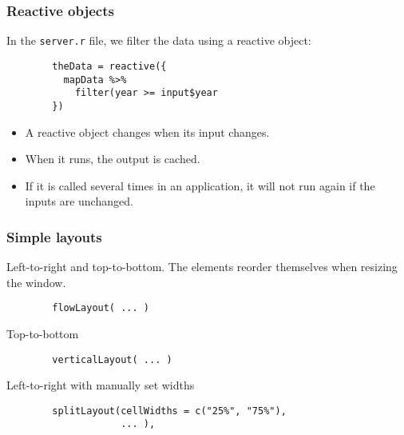 \documentclass{beamer}
\begin{document}
	\begin{frame}[fragile]
		\frametitle{Reactive objects}

		In the \verb|server.r| file, we filter the data using a reactive object:

		\vspace{1em}
		
		\begin{exampleblock}{}
		\begin{lstlisting}
		theData = reactive({
		  mapData %>%
		    filter(year >= input$year
		})
		\end{lstlisting}
		\end{exampleblock}{}

		\vspace{1em}

		\begin{itemize}
			\item A reactive object changes when its input changes.
			\item When it runs, the output is cached.
			\item If it is called several times in an application, it will not run again if the inputs are unchanged.
		\end{itemize}

	\end{frame}

	\begin{frame}[fragile]
		\frametitle{Simple layouts}
		
		Left-to-right and top-to-bottom. The elements reorder themselves when resizing the window.
		\begin{exampleblock}{}
		\begin{BVerbatim}
		flowLayout( ... )
		\end{BVerbatim}
		\end{exampleblock}{}

		\vspace{1em}

		Top-to-bottom
		\begin{exampleblock}{}
		\begin{BVerbatim}
		verticalLayout( ... )
		\end{BVerbatim}
		\end{exampleblock}{}

		\vspace{1em}

		Left-to-right with manually set widths
		\begin{exampleblock}{}
		\begin{lstlisting}
		splitLayout(cellWidths = c("25%", "75%"),
		            ... ),
		\end{lstlisting}
		\end{exampleblock}{}

	\end{frame}
\end{document}
